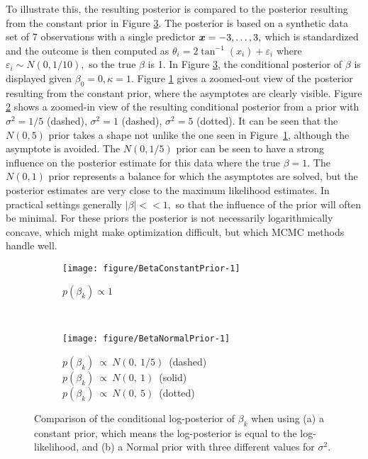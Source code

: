 To illustrate this, the resulting posterior is compared to the posterior resulting from the constant prior in Figure \ref{LikelihoodPriorComparisonBeta}. The posterior is based on a synthetic data set of 7 observations with a single predictor \(\boldsymbol{x} = -3, \dots, 3,\) which is standardized and the outcome is then computed as \( \theta_i =  2 \tan^{-1}(x_i) + \varepsilon_i \) where \( \varepsilon_i \sim N(0, 1/10),\) so the true \(\beta\) is 1. In Figure \ref{LikelihoodPriorComparisonBeta}, the conditional posterior of \(\beta\) is displayed given \(\beta_0 = 0, \kappa = 1.\) Figure \ref{BetaConstantPrior} gives a zoomed-out view of the  posterior resulting from the constant prior, where the asymptotes are clearly visible. Figure \ref{BetaNormalPrior} shows a zoomed-in view of the resulting conditional posterior from a prior with \(\sigma^2 = 1/5\) (dashed), \(\sigma^2 = 1\) (dashed), \(\sigma^2 = 5\) (dotted). It can be seen that the \(N(0, 5)\) prior takes a shape not unlike the one seen in Figure~\ref{BetaConstantPrior}, although the asymptote is avoided. The \(N(0, 1/5)\) prior can be seen to have a strong influence on the posterior estimate for this data where the true \(\beta = 1.\) The \(N(0, 1)\) prior represents a balance for which the asymptotes are solved, but the posterior estimates are very close to the maximum likelihood estimates. In practical settings generally \(\vert\beta\vert << 1,\) so that the influence of the prior will often be minimal. For these priors the posterior is not necessarily logarithmically concave, which might make optimization difficult, but which MCMC methods handle well.



\begin{figure}
\begin{subfigure}[t]{0.5\textwidth}
\begin{knitrout}
\color{fgcolor}
\texttt{[image: figure/BetaConstantPrior-1]} 

\end{knitrout}
\caption{$p(\beta_k) \propto 1$}
\label{BetaConstantPrior}
\end{subfigure}
~
\begin{subfigure}[t]{0.5\textwidth}
\begin{knitrout}
\color{fgcolor}
\texttt{[image: figure/BetaNormalPrior-1]} 

\end{knitrout}
\caption[;  ; ]
    {$p(\beta_k)~\propto~N(0,~1/5)$~(dashed) \\ $p(\beta_k)~\propto~N(0,~1)$~(solid) \\ $p(\beta_k)~\propto~N(0,~5)$~(dotted) \endtabular}
\label{BetaNormalPrior}
\end{subfigure}

\caption{Comparison of the conditional log-posterior of $\beta_k$ when using (a) a constant prior, which means the log-posterior is equal to the log-likelihood, and (b) a Normal prior with three different values for \(\sigma^2\).}
\label{LikelihoodPriorComparisonBeta}
\end{figure}

